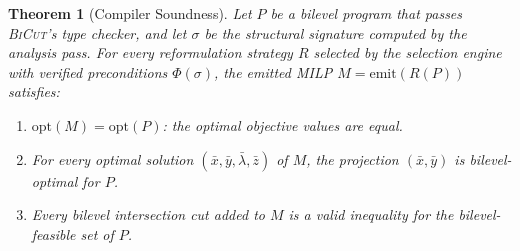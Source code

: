 \documentclass[11pt]{article}
\newtheorem{theorem}{Theorem}
\newcommand{\opt}{\mathrm{opt}}
\newcommand{\BiCut}{\textsc{BiCut}}
\begin{document}
\begin{theorem}[Compiler Soundness]
\label{thm:soundness}
Let $P$ be a bilevel program that passes \BiCut's type checker, and let
$\sigma$ be the structural signature computed by the analysis pass. For
every reformulation strategy $R$ selected by the selection engine with
verified preconditions $\Phi(\sigma)$, the emitted MILP $M = \text{emit}(R(P))$
satisfies:
\begin{enumerate}
\item[(i)] $\opt(M) = \opt(P)$: the optimal objective values are equal.
\item[(ii)] For every optimal solution $(\bar{x}, \bar{y}, \bar{\lambda}, \bar{z})$
  of $M$, the projection $(\bar{x}, \bar{y})$ is bilevel-optimal for $P$.
\item[(iii)] Every bilevel intersection cut added to $M$ is a valid inequality
  for the bilevel-feasible set of $P$.
\end{enumerate}
\end{theorem}
\end{document}

